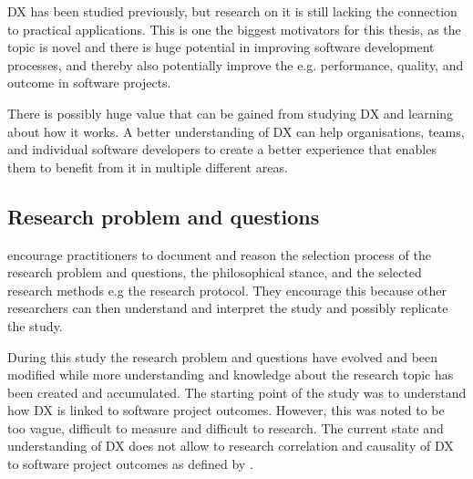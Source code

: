 \documentclass[english, 12pt, a4paper, sci, utf8, a-1b, online]{aaltothesis}
\begin{document}
DX has been studied previously, but research on it is still lacking the connection to practical applications. This is one the biggest motivators for this thesis, as the topic is novel and there is huge potential in improving software development processes, and thereby also potentially improve the e.g. performance, quality, and outcome in software projects.

There is possibly huge value that can be gained from studying DX and learning about how it works. A better understanding of DX can help organisations, teams, and individual software developers to create a better experience that enables them to benefit from it in multiple different areas.


\subsection{Research problem and questions}

\cite{easterbrook2008selecting} encourage practitioners to document and reason the selection process of the research problem and questions, the philosophical stance, and the selected research methods e.g the research protocol. They encourage this because other researchers can then understand and interpret the study and possibly replicate the study.

During this study the research problem and questions have evolved and been modified while more understanding and knowledge about the research topic has been created and accumulated. The starting point of the study was to understand how DX is linked to software project outcomes. However, this was noted to be too vague, difficult to measure and difficult to research. The current state and understanding of DX does not allow to research correlation and causality of DX to software project outcomes as defined by \cite{easterbrook2008selecting}.
\end{document}
